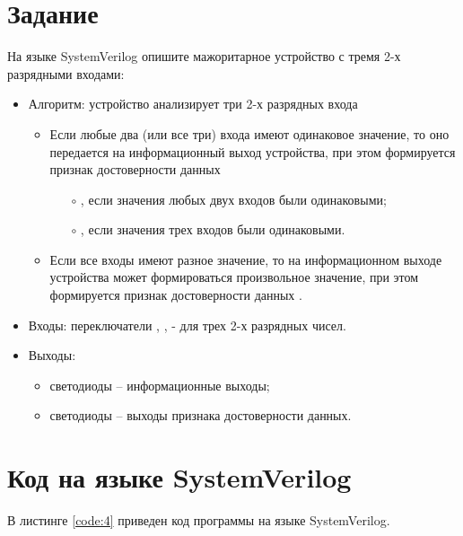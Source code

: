 





\tableofcontents
\listoffigures
\lstlistoflistings
\newpage

\section{Задание}

На языке SystemVerilog опишите мажоритарное устройство с тремя 2-х разрядными входами:
\begin{itemize}
	\item Алгоритм: устройство анализирует три 2-х разрядных входа
		\begin{itemize}
			\item Если любые два (или все три) входа имеют одинаковое значение, то оно передается на информационный выход устройства, при этом формируется признак достоверности данных
				\begin{itemize}
					\item[$\circ$] , если значения любых двух входов были одинаковыми;
					\item[$\circ$] , если значения трех входов были одинаковыми.
				\end{itemize}
			\item Если все входы имеют разное значение, то на информационном выходе устройства может формироваться произвольное значение, при этом формируется признак достоверности данных .
		\end{itemize}
	\item Входы: переключатели , ,  - для трех 2-х разрядных чисел.
	\item Выходы:
		\begin{itemize}
			\item светодиоды  -- информационные выходы;
			\item светодиоды  -- выходы признака достоверности данных.
		\end{itemize}
\end{itemize}

\section{Код на языке SystemVerilog}

В листинге \ref{code:4} приведен код программы на языке SystemVerilog.

